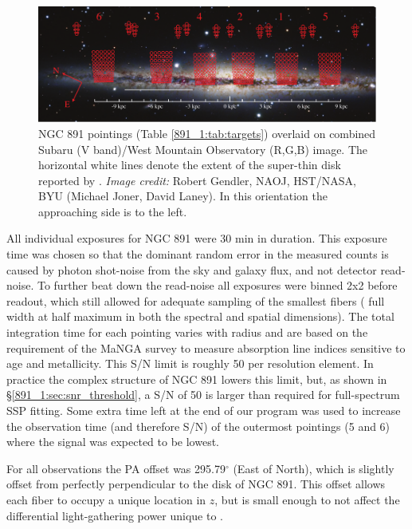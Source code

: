 \begin{figure}
  \centering
  \includegraphics[width=\textwidth]{891_1/figs/NGC_891_better_pointings.pdf}
  \caption[NGC 891 \GP pointing map]{\label{891_1:fig:pointings}\fixspacing
    NGC 891 \GP pointings (Table \ref{891_1:tab:targets}) overlaid on
    combined Subaru (V band)/West Mountain Observatory (R,G,B)
    image. The horizontal white lines denote the extent of the
    super-thin disk reported by \citet{Schechtman-Rook13}. \emph{Image
      credit:} Robert Gendler, NAOJ, HST/NASA, BYU (Michael Joner,
    David Laney). In this orientation the approaching side is to the
    left.}
\end{figure}

All individual exposures for NGC 891 were 30 min in duration. This
exposure time was chosen so that the dominant random error in the
measured counts is caused by photon shot-noise from the sky and galaxy
flux, and not detector read-noise. To further beat down the read-noise
all exposures were binned 2x2 before readout, which still allowed for
adequate sampling of the smallest fibers ( full
width at half maximum in both the spectral and spatial
dimensions). The total integration time for each pointing varies with
radius and are based on the requirement of the MaNGA survey
\citep{Bundy15} to measure absorption line indices sensitive to age
and metallicity. This S/N limit is roughly 50 per resolution
element. In practice the complex structure of NGC 891 lowers this
limit, but, as shown in \S\ref{891_1:sec:snr_threshold}, a S/N of 50 is
larger than required for full-spectrum SSP fitting. Some extra time
left at the end of our program was used to increase the observation
time (and therefore S/N) of the outermost pointings (5 and 6) where
the signal was expected to be lowest.

For all \GP observations the PA offset was 295.79$^{\circ}$ (East of
North), which is slightly offset from perfectly perpendicular to the
disk of NGC 891. This offset allows each fiber to occupy a unique
location in $z$, but is small enough to not affect the differential
light-gathering power unique to \GP.

